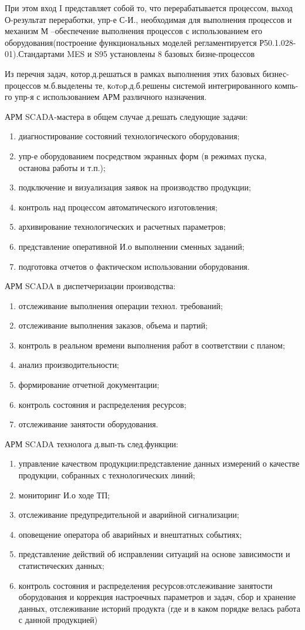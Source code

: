 \documentclass[unicode, 12pt, a4paper, oneside]{article}
\begin{document}
При этом вход I представляет собой то, что перерабатывается процессом, выход О-результат переработки, упр-е С-И., необходимая для выполнения процессов и механизм М –обеспечение выполнения процессов с использованием его оборудования(построение функциональных моделей регламентируется Р50.1.028-01).Стандартами MES и S95 установлены 8 базовых бизне-процессов

Из перечня задач, котор.д.решаться в рамках выполнения этих базовых бизнес-процессов м.б.выделены те, кoтoр.д.б.решены системой интегрированного компь-го упр-я с использованием АРМ различного назначения.

АРМ SCADA-мастера в общем случае д.решать следующие задачи:
\begin{enumerate}
\item диагностирование состояний технологического оборудования;
\item упр-е оборудованием посредством экранных форм (в режимах пуска, останова работы и т.п.);
\item подключение и визуализация заявок на производство продукции;
\item контроль над процессом автоматического изготовления;
\item архивирование технологических и расчетных параметров;
\item представление оперативной И.о выполнении сменных заданий;
\item подготовка отчетов о фактическом использовании оборудования.
\end{enumerate}
АРМ SCADA в диспетчеризации производства:
\begin{enumerate}
\item	отслеживание выполнения операции технол. требований;
\item	отслеживание выполнения заказов, объема и партий;
\item	контроль в реальном времени выполнения работ в соответствии с планом;
\item	анализ производительности;
\item	формирование отчетной документации;
\item	контроль состояния и распределения ресурсов;
\item	отслеживание занятости оборудования.
\end{enumerate}
АРМ SCADA технолога д.вып-ть след.функции:
\begin{enumerate}
\item управление качеством продукции:представление данных измерений о качестве продукции, собранных с технологических линий;
\item мониторинг И.о ходе ТП;
\item отслеживание предупредительной и аварийной сигнализации;
\item оповещение оператора об аварийных и внештатных событиях;
\item представление действий об исправлении ситуаций на основе зависимости и статистических данных;
\item контроль состояния и распределения ресурсов:отслеживание занятости оборудования и коррекция настроечных параметров и задач, сбор и хранение данных, отслеживание историй продукта (где и в каком порядке велась работа с данной продукцией)
\end{enumerate}
\end{document}
